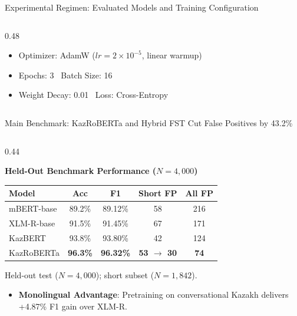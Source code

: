 \documentclass[aspectratio=169, 10pt]{beamer}
\newcommand{\subhead}[1]{{\normalsize\textbf{\color{DarkNavy}#1}\par\vspace{3pt}}}
\begin{document}
\begin{frame}{Experimental Regimen: Evaluated Models and Training Configuration}
\begin{columns}[T]
\begin{column}{0.48\textwidth}
            \begin{itemize}\setlength{\itemsep}{2pt}\small
                \item Optimizer: AdamW ($lr = 2 \times 10^{-5}$, linear warmup)
                \item Epochs: 3 \textbar\ Batch Size: 16
                \item Weight Decay: 0.01 \textbar\ Loss: Cross-Entropy
            \end{itemize}
        \end{column}
    \end{columns}
\end{frame}

\begin{frame}{Main Benchmark: KazRoBERTa and Hybrid FST Cut False Positives by 43.2\%}
    \begin{columns}[T]
        \begin{column}{0.44\textwidth}
            \subhead{Held-Out Benchmark Performance ($N=4,000$)}
            \vspace{2pt}
            {\scriptsize\setlength{\tabcolsep}{1.5pt}
            \begin{tabular*}{\linewidth}{@{\extracolsep{\fill}}lcccc}
                \toprule
                \textbf{Model} & \textbf{Acc} & \textbf{F1} & \textbf{Short FP} & \textbf{All FP} \\
                \midrule
                mBERT-base & 89.2\% & 89.12\% & 58 & 216 \\
                XLM-R-base & 91.5\% & 91.45\% & 67 & 171 \\
                KazBERT & 93.8\% & 93.80\% & 42 & 124 \\
                KazRoBERTa & \textbf{96.3\%} & \textbf{96.32\%} & \textbf{53 $\to$ 30} & \textbf{74} \\
                \bottomrule
            \end{tabular*}}
            \vspace{3pt}
            {\scriptsize\color{SlateText}Held-out test ($N=4,000$); short subset ($N=1,842$).\par}
            \vspace{3pt}
            \begin{itemize}\setlength{\itemsep}{2pt}\footnotesize
                \item \textbf{Monolingual Advantage}: Pretraining on conversational Kazakh delivers +4.87\% F1 gain over XLM-R.

\end{itemize}
\end{column}
\end{columns}
\end{frame}
\end{document}
